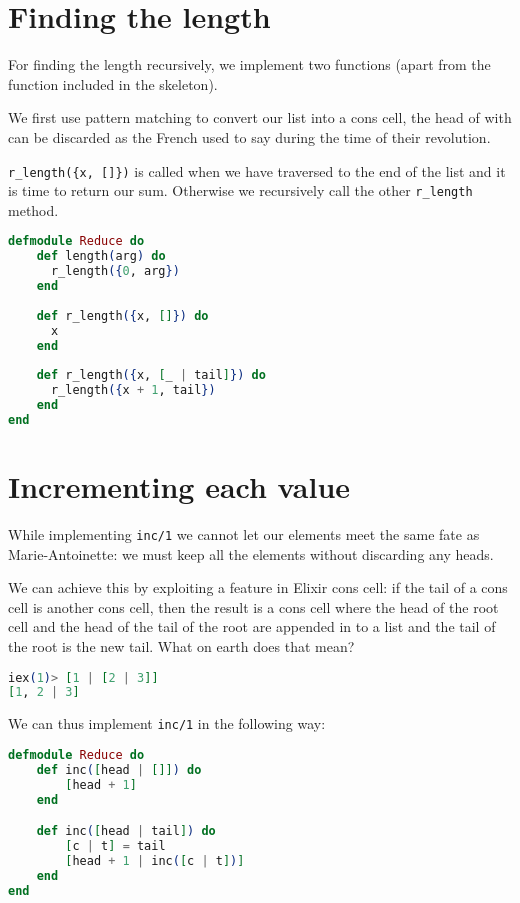 \section{Finding the length}

For finding the length recursively, we implement two functions (apart from the function included in the skeleton).

We first use pattern matching to convert our list into a cons cell, the head of with can be discarded as the French used to say during the time of their revolution.

\texttt{r\_length(\{x, []\})} is called when we have traversed to the end of the list and it is time to return our sum. Otherwise we recursively call the other \texttt{r\_length} method.

\begin{lstlisting}[language=Elixir, caption=Length\, recursively]
defmodule Reduce do
    def length(arg) do
      r_length({0, arg})
    end
  
    def r_length({x, []}) do
      x
    end
  
    def r_length({x, [_ | tail]}) do
      r_length({x + 1, tail})
    end
end
\end{lstlisting}

\section{Incrementing each value}
While implementing \texttt{inc/1} we cannot let our elements meet the same fate as Marie-Antoinette: we must keep all the elements without discarding any heads.

We can achieve this by exploiting a feature in Elixir cons cell: if the tail of a cons cell is another cons cell, then the result is a cons cell where the head of the root cell and the head of the tail of the root are appended in to a list and the tail of the root is the new tail. What on earth does that mean?
\pagebreak
\begin{lstlisting}[language=Elixir, caption=Cons cells\, exploited]
iex(1)> [1 | [2 | 3]]
[1, 2 | 3]
\end{lstlisting}

We can thus implement \texttt{inc/1} in the following way:
\begin{lstlisting}[language=Elixir, caption=\texttt{inc/1}\, implemented `exploitedly']
defmodule Reduce do
    def inc([head | []]) do
        [head + 1]
    end

    def inc([head | tail]) do
        [c | t] = tail
        [head + 1 | inc([c | t])]
    end
end
\end{lstlisting}


